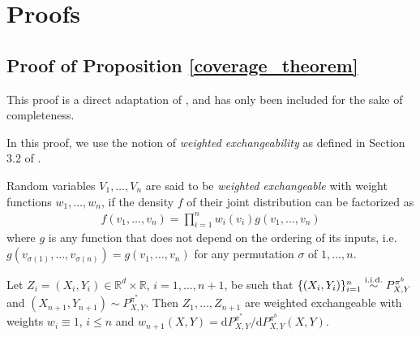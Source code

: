 \section{Proofs}\label{sec:proofs}
\subsection{Proof of Proposition \ref{coverage_theorem}} 
This proof is a direct adaptation of \cite[Lemma 3]{tibshirani2020conformal}, and has only been included for the sake of completeness.

In this proof, we use the notion of \textit{weighted exchangeability} as defined in Section 3.2 of \cite{tibshirani2020conformal}.
\begin{definition}\label{def:weighted_exch}
Random variables $V_1, \dots, V_n$ are said to be \textit{weighted exchangeable} with weight functions $w_1, \dots, w_n$, if the density $f$ of their joint distribution can be factorized as
\begin{align}
    f(v_1, \dots, v_n) = \prod_{i=1}^n w_i(v_i) g(v_1, \dots, v_n)
\end{align}
where $g$ is any function that does not depend on the ordering of its inputs, i.e. $g(v_{\sigma(1)}, \dots, v_{\sigma(n)}) = g(v_1, \dots, v_n)$ for any permutation $\sigma$ of $1, \dots, n$.
\end{definition}

\begin{lemma}\label{exchangeability_lemma}
Let $Z_i = (X_i, Y_i) \in \mathbb{R}^d \times \mathbb{R}$, $i=1,...,n+1$, be such that $\{(X_i, Y_i)\}_{i=1}^n \overset{\textup{i.i.d.}}{\sim}P^{\pi^b}_{X,Y}$ and $(X_{n+1}, Y_{n+1}) \sim P^{\pi^*}_{X,Y}$. Then $Z_1, \dots, Z_{n+1}$ are weighted exchangeable with weights $w_i \equiv 1$, $i\leq n$ and $w_{n+1}(X,Y) = \mathrm{d}P^{\pi^{*}}_{X,Y}/\mathrm{d}P^{\pi^{b}}_{X,Y}(X,Y)$.
\end{lemma}

